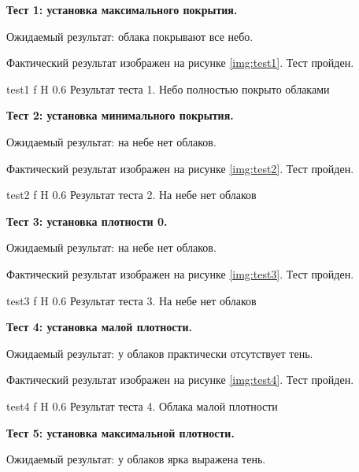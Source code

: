 \textbf{Тест 1: установка максимального покрытия.}

Ожидаемый результат: облака покрывают все небо.

Фактический результат изображен на рисунке \ref{img:test1}. Тест пройден.

{test1} %
{f} %
{H} %
{0.6\textwidth} %
{Результат теста 1. Небо полностью покрыто облаками} %


\textbf{Тест 2: установка минимального покрытия.}

Ожидаемый результат: на небе нет облаков.

Фактический результат изображен на рисунке \ref{img:test2}. Тест пройден.

{test2} %
{f} %
{H} %
{0.6\textwidth} %
{Результат теста 2. На небе нет облаков} %


\textbf{Тест 3: установка плотности 0.}

Ожидаемый результат: на небе нет облаков.

Фактический результат изображен на рисунке \ref{img:test3}. Тест пройден.

{test3} %
{f} %
{H} %
{0.6\textwidth} %
{Результат теста 3. На небе нет облаков} %



\textbf{Тест 4: установка малой плотности.}

Ожидаемый результат: у облаков практически отсутствует тень.

Фактический результат изображен на рисунке \ref{img:test4}. Тест пройден.

{test4} %
{f} %
{H} %
{0.6\textwidth} %
{Результат теста 4. Облака малой плотности} %


\textbf{Тест 5: установка максимальной плотности.}

Ожидаемый результат: у облаков ярка выражена тень.

